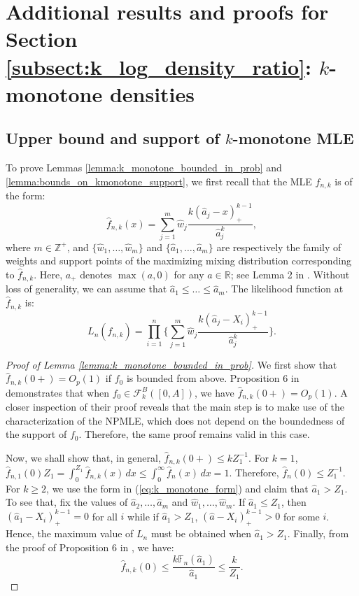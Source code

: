 \documentclass[12pt,letterpaper, twoside, openany]{article}
\theoremstyle{plain}
\begin{document}
\section{Additional results and proofs for Section \ref{subsect:k_log_density_ratio}: $k$-monotone densities}
\subsection{Upper bound and support of $k$-monotone MLE}
To prove Lemmas \ref{lemma:k_monotone_bounded_in_prob} and \ref{lemma:bounds_on_kmonotone_support}, we first recall that the MLE $\hat{f}_{n,k}$ is of the form: 
\begin{equation}\label{eq:k_monotone_form}
\hat{f}_{n,k}(x) = \sum^m_{j=1} \hat{w}_j \frac{k(\hat{a}_j - x)^{k-1}_+}{\hat{a}^k_j},
\end{equation}
where $m \in \mathbb{Z}^+$, and  $\{\hat{w}_1,\ldots,\hat{w}_m\}$ and $\{\hat{a}_1,\ldots,\hat{a}_m\}$ are respectively the family of weights and support points of the maximizing mixing distribution corresponding to $\hat{f}_{n,k}$. Here, $a_+$ denotes $\max(a, 0)$ for any $a \in \mathbb{R}$; see Lemma 2 in \cite{balabdaoui2010estimation}. Without loss of generality, we can assume that $\hat{a}_1 \leq \ldots \leq \hat{a}_m$. The likelihood function at $\hat{f}_{n,k}$ is:
\begin{equation*}
L_n(\hat{f}_{n,k}) = \prod^n_{i=1} \bigg\{ \sum^m_{j=1} \hat{w}_j \frac{k(\hat{a}_j - X_i)^{k-1}_+}{\hat{a}^k_j} \bigg\}.
\end{equation*} 

\begin{proof}[Proof of Lemma \ref{lemma:k_monotone_bounded_in_prob}]
We first show that $\hat{f}_{n,k}(0+) = O_p(1)$ if $f_0$ is bounded from above. Proposition 6 in \cite{gao2009rate} demonstrates that when $f_0 \in \mathcal{F}_k^B([0, A])$, we have $\hat{f}_{n,k}(0+) = O_p(1)$. A closer inspection of their proof reveals that the main step is to make use of the characterization of the NPMLE, which does not depend on the boundedness of the support of $f_0$. Therefore, the same proof remains valid in this case.

Now, we shall show that, in general, $\hat{f}_{n,k}(0+) \leq k Z^{-1}_1$. For $k=1$, $\hat{f}_{n,1}(0)Z_1 = \int^{Z_1}_0 \hat{f}_{n,k}(x)\, dx \leq \int^\infty_0 \hat{f}_n(x) \, dx = 1$. Therefore, $\hat{f}_n(0) \leq Z^{-1}_1$. For $k \geq 2$, we  use 
 the form in (\ref{eq:k_monotone_form}) and claim that $\hat{a}_1 > Z_1$. To see that, fix the values of $\hat{a}_2,\ldots,\hat{a}_{m}$ and $\hat{w}_1,\ldots,\hat{w}_m$. If $\hat{a}_1 \leq Z_1$, then $(\hat{a}_1 - X_i)^{k-1}_+ = 0$ for all $i$ while if $\hat{a}_1 > Z_1$, $(\hat{a} - X_i)_+^{k-1} > 0$ for some $i$. Hence, the maximum value of $L_n$ must be obtained when $\hat{a}_1 > Z_1$. Finally, from the proof of Proposition 6 in \cite{gao2009rate}, we have:
\begin{equation*}
	\hat{f}_{n,k}(0) \leq \frac{k \mathbb{F}_n(\hat{a}_1)}{\hat{a}_1} \leq \frac{k}{Z_1}.
\end{equation*}

\end{proof}
\end{document}
